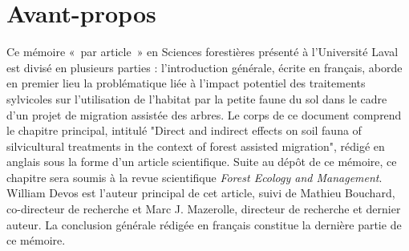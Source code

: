 \chapter*{Avant-propos}         %
\label{chap-avantpropos}        %


Ce mémoire « par article » en Sciences forestières présenté à l'Université Laval est divisé en plusieurs parties : 
l'introduction générale, écrite en français, aborde en premier lieu la problématique liée à l'impact potentiel des traitements sylvicoles sur 
l'utilisation de l'habitat par la petite faune du sol dans le cadre d'un projet de migration assistée des arbres.
Le corps de ce document comprend le chapitre principal, intitulé 
"Direct and indirect effects on soil fauna of silvicultural treatments in the context of forest assisted migration", rédigé en anglais sous la forme d'un article scientifique. 
Suite au dépôt de ce mémoire, ce chapitre sera soumis à la revue scientifique \textit{Forest Ecology and Management}. 
William Devos est l'auteur principal de cet article, suivi de Mathieu Bouchard, co-directeur de recherche et Marc J. Mazerolle, directeur de recherche et dernier auteur.
La conclusion générale rédigée en français constitue la dernière partie de ce mémoire.
